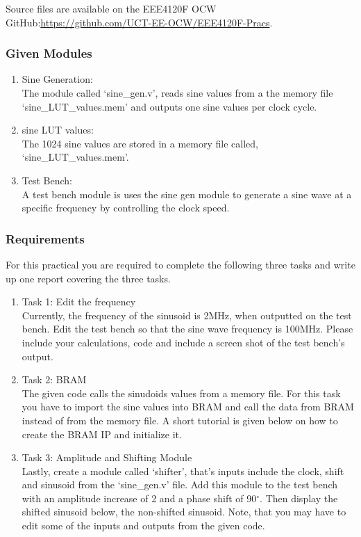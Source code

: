 Source files are available on the EEE4120F OCW GitHub:\newline \href{https://github.com/UCT-EE-OCW/EEE4120F-Pracs}{https://github.com/UCT-EE-OCW/EEE4120F-Pracs}.


\subsubsection{Given Modules}
\begin{enumerate}
    \item Sine Generation:\\
    The module called `sine\_gen.v', reads sine values from a the memory file `sine\_LUT\_values.mem' and outputs one sine values per clock cycle.
    \item sine LUT values:\\
     The 1024 sine values are stored in a memory file called, `sine\_LUT\_values.mem'.
    \item Test Bench:\\
    A test bench module is uses the sine gen module to generate a sine wave at a specific frequency by controlling the clock speed.
\end{enumerate}

\subsubsection{Requirements}
For this practical you are required to complete the following three tasks and write up one report covering the three tasks.
\begin{enumerate}
    \item Task 1: Edit the frequency\\
    Currently, the frequency of the sinusoid is 2MHz, when outputted on the test bench. Edit the test bench so that the sine wave frequency is 100MHz. Please include your calculations, code and include a screen shot of the test bench's output.
    \item Task 2: BRAM\\
     The given code calls the sinudoids values from a memory file. For this task you have to import the sine values into BRAM and call the data from BRAM instead of from the memory file. A short tutorial is given below on how to create the BRAM IP and initialize it. 
    \item Task 3: Amplitude and Shifting Module\\
    Lastly, create a module called `shifter', that's inputs include the clock, shift and sinusoid from the `sine\_gen.v' file. Add this module to the test bench with an amplitude increase of 2 and a phase shift of 90$^{\circ}$. Then display the shifted sinusoid below, the non-shifted sinusoid. Note, that you may have to edit some of the inputs and outputs from the given code.
\end{enumerate}


